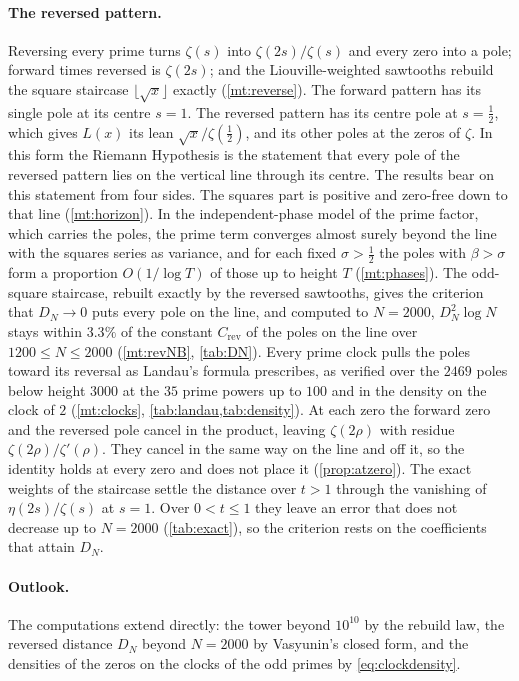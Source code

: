 \documentclass[11pt]{article}
\theoremstyle{definition}\newtheorem{definition}[theorem]{Definition}
\theoremstyle{remark}\newtheorem{remark}[theorem]{Remark}
\theoremstyle{definition}\newtheorem{axiom}{Axiom}
\begin{document}
\paragraph{The reversed pattern.} Reversing every prime turns $\zeta(s)$ into $\zeta(2s)/\zeta(s)$ and every zero into a pole; forward times reversed is $\zeta(2s)$; and the Liouville-weighted sawtooths rebuild the square staircase $\lfloor\sqrt x\rfloor$ exactly (\cref{mt:reverse}). The forward pattern has its single pole at its centre $s=1$. The reversed pattern has its centre pole at $s=\frac12$, which gives $L(x)$ its lean $\sqrt x/\zeta(\frac12)$, and its other poles at the zeros of $\zeta$. In this form the Riemann Hypothesis is the statement that every pole of the reversed pattern lies on the vertical line through its centre. The results bear on this statement from four sides. The squares part is positive and zero-free down to that line (\cref{mt:horizon}). In the independent-phase model of the prime factor, which carries the poles, the prime term converges almost surely beyond the line with the squares series as variance, and for each fixed $\sigma>\frac12$ the poles with $\beta>\sigma$ form a proportion $O(1/\log T)$ of those up to height $T$ (\cref{mt:phases}). The odd-square staircase, rebuilt exactly by the reversed sawtooths, gives the criterion that $D_N\to0$ puts every pole on the line, and computed to $N=2000$, $D_N^2\log N$ stays within $3.3\%$ of the constant $C_{\mathrm{rev}}$ of the poles on the line over $1200\le N\le2000$ (\cref{mt:revNB}, \cref{tab:DN}). Every prime clock pulls the poles toward its reversal as Landau's formula prescribes, as verified over the $2469$ poles below height $3000$ at the $35$ prime powers up to $100$ and in the density on the clock of $2$ (\cref{mt:clocks}, \cref{tab:landau,tab:density}). At each zero the forward zero and the reversed pole cancel in the product, leaving $\zeta(2\rho)$ with residue $\zeta(2\rho)/\zeta'(\rho)$. They cancel in the same way on the line and off it, so the identity holds at every zero and does not place it (\cref{prop:atzero}). The exact weights of the staircase settle the distance over $t>1$ through the vanishing of $\eta(2s)/\zeta(s)$ at $s=1$. Over $0<t\le1$ they leave an error that does not decrease up to $N=2000$ (\cref{tab:exact}), so the criterion rests on the coefficients that attain $D_N$.

\paragraph{Outlook.} The computations extend directly: the tower beyond $10^{10}$ by the rebuild law, the reversed distance $D_N$ beyond $N=2000$ by Vasyunin's closed form, and the densities of the zeros on the clocks of the odd primes by \eqref{eq:clockdensity}.
\end{document}
